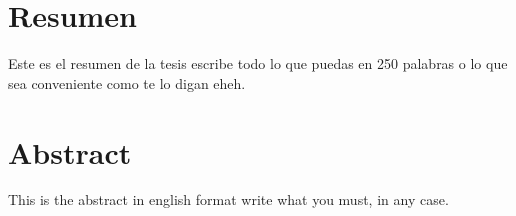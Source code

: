 \chapter*{Resumen}
Este es el resumen de la tesis escribe todo lo que puedas en 250 palabras o lo que sea conveniente como te lo digan eheh.
\chapter*{Abstract}
This is the abstract in english format write what you must, in any case.

